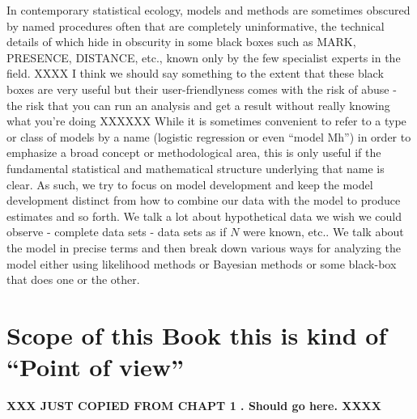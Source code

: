 In contemporary statistical ecology, models and methods are sometimes
obscured by named procedures often that are completely uninformative,
the technical details of which hide in obscurity in some black boxes
such as MARK, PRESENCE, DISTANCE, etc., known only by the few
specialist experts in the field. 
XXXX I think we should say something to the extent that these black boxes are very useful but their user-friendlyness comes with the risk of abuse - the risk that you can run an analysis and get a result without really knowing what you're doing XXXXXX
While it is sometimes convenient to
refer to a type or class of models by a name (logistic regression or
even ``model Mh'') in order to emphasize a broad concept or
methodological area, this is only useful if the fundamental
statistical and mathematical structure underlying that name is
clear. As such, we try to focus on model development and keep the
model development distinct from how to combine our data with the model
to produce estimates and so forth. We talk a lot about hypothetical
data we wish we could observe - complete data sets - data sets as if
$N$ were known, etc.. We talk about the model in precise terms and
then break down various ways for analyzing the model either using
likelihood methods or Bayesian methods or some black-box that does one
or the other.



\section{Scope of this Book  this is kind of ``Point of view''}

{\bf XXX JUST COPIED FROM CHAPT 1 . Should go here. XXXX}


